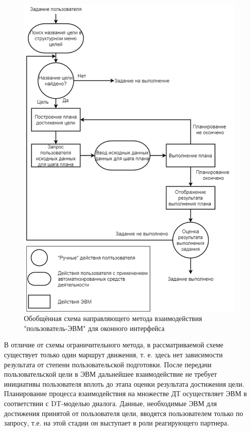 \begin{figure}[!ht]
  \centering
  \includegraphics[scale=0.8]{ResearchNotes/rndhpc_not_gui_2022_10_10/scheme2.png}
  \caption{Обобщённая схема направляющего метода взаимодействия "пользователь-ЭВМ" для оконного интерфейса}
  \label{scheme2}
\end{figure}

	В отличие от схемы ограничительного метода, в рассматриваемой схеме существует только один маршрут движения, т. е. здесь нет зависимости результата от степени пользовательской подготовки. После передачи пользовательской цели в ЭВМ дальнейшее взаимодействие не требует инициативы пользователя вплоть до этапа оценки результата достижения цели. Планирование процесса взаимодействия на множестве ДТ осуществляет ЭВМ в соответствии с DT-моделью диалога. Данные, необходимые ЭВМ для достижения принятой от пользователя цели, вводятся пользователем только по запросу, т.е. на этой стадии он выступает в роли реагирующего партнера.

